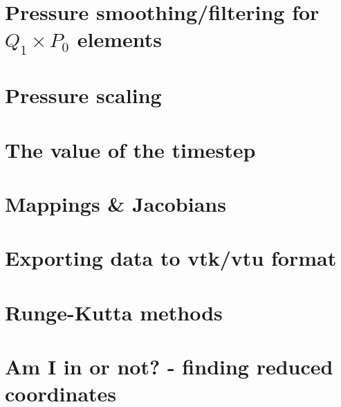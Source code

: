\section{Pressure smoothing/filtering for $Q_1\times P_0$ elements \label{psmoothing}} 
\newpage %
\section{Pressure scaling \label{pscaling}}  %
\newpage %
\newpage %
\section{The value of the timestep}\label{ss:cfl}  %
\newpage %
\section{Mappings \& Jacobians \label{ss:mappings}}  %
\newpage %
\section{Exporting data to vtk/vtu format}  %
\newpage %
\section{Runge-Kutta methods}\label{ss:rkm}  %
\newpage %
\section{Am I in or not? - finding reduced coordinates}\label{sec:amiin} %
\newpage %
